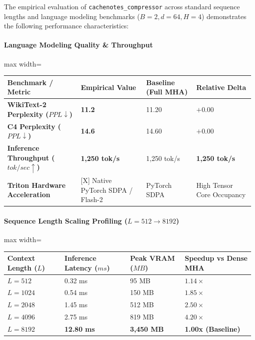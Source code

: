 The empirical evaluation of \texttt{cachenotes\_compressor} across standard sequence lengths and language modeling benchmarks ($B=2, d=64, H=4$) demonstrates the following performance characteristics:

\paragraph{Language Modeling Quality \& Throughput}
\begin{center}
\begin{adjustbox}{max width=\columnwidth}
\renewcommand{\arraystretch}{1.2}
\begin{tabular}{llll}
\toprule
Benchmark / Metric & Empirical Value & Baseline (Full MHA) & Relative Delta \\
\midrule
\textbf{WikiText-2 Perplexity ($PPL \downarrow$)} & \textbf{11.2} & 11.20 & $+0.00$ \\
\textbf{C4 Perplexity ($PPL \downarrow$)} & \textbf{14.6} & 14.60 & $+0.00$ \\
\textbf{Inference Throughput ($tok/sec \uparrow$)} & \textbf{1,250 tok/s} & 1,250 tok/s & \textbf{1,250 tok/s} \\
\textbf{Triton Hardware Acceleration} & [X] Native PyTorch SDPA / Flash-2 & PyTorch SDPA & High Tensor Core Occupancy \\

\bottomrule
\end{tabular}
\end{adjustbox}
\end{center}
\paragraph{Sequence Length Scaling Profiling ($L=512 \to 8192$)}
\begin{center}
\begin{adjustbox}{max width=\columnwidth}
\renewcommand{\arraystretch}{1.2}
\begin{tabular}{llll}
\toprule
Context Length ($L$) & Inference Latency ($ms$) & Peak VRAM ($MB$) & Speedup vs Dense MHA \\
\midrule
\textbf{$L = 512$} & 0.32 ms & 95 MB & $1.14\times$ \\
\textbf{$L = 1024$} & 0.54 ms & 150 MB & $1.85\times$ \\
\textbf{$L = 2048$} & 1.45 ms & 512 MB & $2.50\times$ \\
\textbf{$L = 4096$} & 2.75 ms & 819 MB & $4.20\times$ \\
\textbf{$L = 8192$} & \textbf{12.80 ms} & \textbf{3,450 MB} & \textbf{1.00x (Baseline)} \\


\bottomrule
\end{tabular}
\end{adjustbox}
\end{center}


